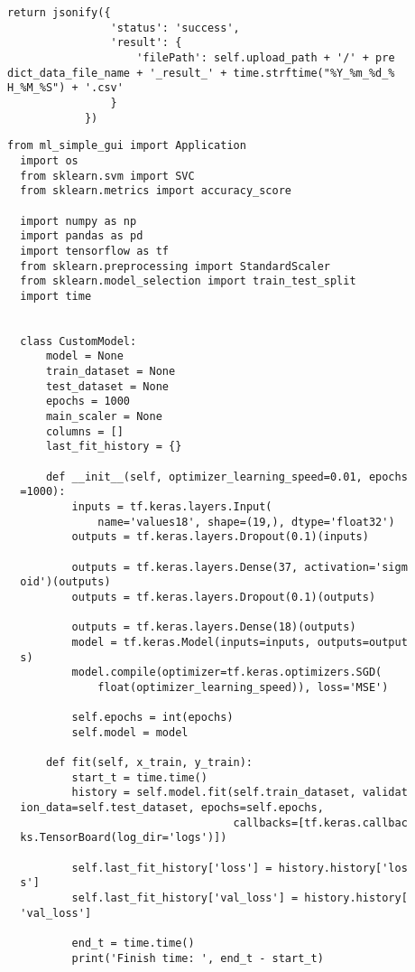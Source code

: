 \begin{lstlisting}[caption={Код backend-части приложения}, label={ls:a:01}]
            return jsonify({
                'status': 'success',
                'result': {
                    'filePath': self.upload_path + '/' + pre
dict_data_file_name + '_result_' + time.strftime("%Y_%m_%d_%
H_%M_%S") + '.csv'
                }
            })
\end{lstlisting}



\begin{lstlisting}[caption={Код программы для тестирования приложения с подключенной моделью регрессии экспериментальных данных}, label={ls:a:02}]
  from ml_simple_gui import Application
  import os
  from sklearn.svm import SVC
  from sklearn.metrics import accuracy_score
  
  import numpy as np
  import pandas as pd
  import tensorflow as tf
  from sklearn.preprocessing import StandardScaler
  from sklearn.model_selection import train_test_split
  import time
  
  
  class CustomModel:
      model = None
      train_dataset = None
      test_dataset = None
      epochs = 1000
      main_scaler = None
      columns = []
      last_fit_history = {}
  
      def __init__(self, optimizer_learning_speed=0.01, epochs
  =1000):
          inputs = tf.keras.layers.Input(
              name='values18', shape=(19,), dtype='float32')
          outputs = tf.keras.layers.Dropout(0.1)(inputs)
  
          outputs = tf.keras.layers.Dense(37, activation='sigm
  oid')(outputs)
          outputs = tf.keras.layers.Dropout(0.1)(outputs)
  
          outputs = tf.keras.layers.Dense(18)(outputs)
          model = tf.keras.Model(inputs=inputs, outputs=output
  s)
          model.compile(optimizer=tf.keras.optimizers.SGD(
              float(optimizer_learning_speed)), loss='MSE')
  
          self.epochs = int(epochs)
          self.model = model
  
      def fit(self, x_train, y_train):
          start_t = time.time()
          history = self.model.fit(self.train_dataset, validat
  ion_data=self.test_dataset, epochs=self.epochs,
                                   callbacks=[tf.keras.callbac
  ks.TensorBoard(log_dir='logs')])
  
          self.last_fit_history['loss'] = history.history['los
  s']
          self.last_fit_history['val_loss'] = history.history[
  'val_loss']
  
          end_t = time.time()
          print('Finish time: ', end_t - start_t)
  

\end{lstlisting}
